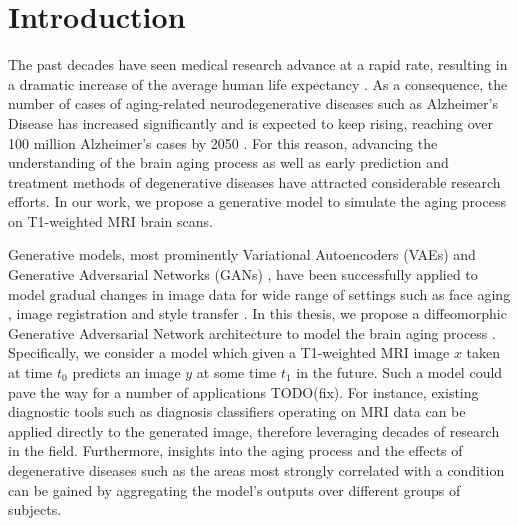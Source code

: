\chapter{Introduction}




The past decades have seen medical research advance at a rapid rate, resulting in a dramatic increase of the average human life expectancy \cite{owidlifeexpectancy}. As a consequence, the number of cases of aging-related neurodegenerative diseases such as Alzheimer's Disease has increased significantly and is expected to keep rising, reaching over 100 million Alzheimer's cases by 2050 \cite{brookmeyer2007forecasting}. For this reason, advancing the understanding of the brain aging process as well as early prediction and treatment methods of degenerative diseases have attracted considerable research efforts. In our work, we propose a generative model to simulate the aging process on T1-weighted MRI brain scans.

Generative models, most prominently Variational Autoencoders (VAEs) \cite{kingma2013auto} and Generative Adversarial Networks (GANs) \cite{goodfellow2014generative}, have been successfully applied to model gradual changes in image data for wide range of settings such as face aging \cite{palsson2018generative}, image registration \cite{balakrishnan2019voxelmorph} and style transfer \cite{zhu2017unpaired}. In this thesis, we propose a diffeomorphic Generative Adversarial Network architecture to model the brain aging process . Specifically, we consider a model which given a T1-weighted MRI image $x$ taken at time $t_0$ predicts an image $y$ at some time $t_1$ in the future. Such a model could pave the way for a number of applications TODO(fix). For instance, existing diagnostic tools such as diagnosis classifiers operating on MRI data can be applied directly to the generated image, therefore leveraging decades of research in the field. Furthermore, insights into the aging process and the effects of degenerative diseases such as the areas most strongly correlated with a condition can be gained by aggregating the model's outputs over different groups of subjects.

